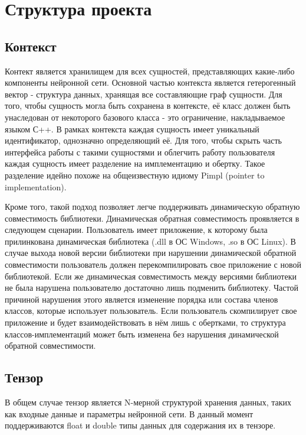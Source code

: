 \clearpage
\section{Структура проекта}

\subsection{Контекст}
Контект является хранилищем для всех сущностей, представляющих какие-либо компоненты нейронной сети. Основной частью контекста является гетерогенный вектор - структура данных, хранящая все составляющие граф сущности. Для того, чтобы сущность могла быть сохранена в контексте, её класс должен быть унаследован от некоторого базового класса - это ограничение, накладываемое языком С++. В рамках контекста каждая сущность имеет уникальный идентификатор, однозначно определяющий её. Для того, чтобы скрыть часть интерфейса работы с такими сущностями и облегчить работу пользователя каждая сущность имеет разделение на имплементацию и обертку. Такое разделение идейно похоже на общеизвестную идиому Pimpl (pointer to implementation). 
\par
Кроме того, такой подход позволяет легче поддерживать динамическую обратную совместимость библиотеки. Динамическая обратная совместимость проявляется в следующем сценарии. Пользователь имеет приложение, к которому была прилинкована динамическая библиотека (.dll в ОС Windows, .so в ОС Linux). В случае выхода новой версии библиотеки при нарушении динамической обратной совместимости пользователь должен перекомпилировать свое приложение с новой библиотекой. Если же динамическая совместимость между версиями библиотеки не была нарушена пользователю достаточно лишь подменить библиотеку. Частой причиной нарушения этого является изменение порядка или состава членов классов, которые использует пользователь. Если пользователь скомпилирует свое приложение и будет взаимодействовать в нём лишь с обертками, то структура классов-имплементаций может быть изменена без нарушения динамической обратной совместимости.

\subsection{Тензор}
В общем случае тензор является N-мерной структурой хранения данных, таких как входные данные и параметры нейронной сети. В данный момент поддерживаются float и double типы данных для содержания их в тензоре.

